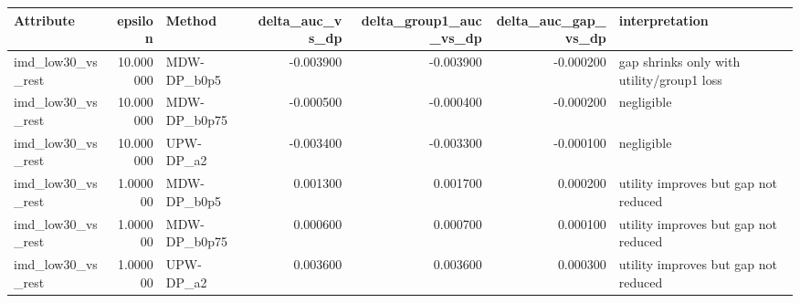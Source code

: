 \begin{tabular}{lrlrrrl}
\toprule
Attribute & epsilon & Method & delta_auc_vs_dp & delta_group1_auc_vs_dp & delta_auc_gap_vs_dp & interpretation \\
\midrule
imd_low30_vs_rest & 10.000000 & MDW-DP_b0p5 & -0.003900 & -0.003900 & -0.000200 & gap shrinks only with utility/group1 loss \\
imd_low30_vs_rest & 10.000000 & MDW-DP_b0p75 & -0.000500 & -0.000400 & -0.000200 & negligible \\
imd_low30_vs_rest & 10.000000 & UPW-DP_a2 & -0.003400 & -0.003300 & -0.000100 & negligible \\
imd_low30_vs_rest & 1.000000 & MDW-DP_b0p5 & 0.001300 & 0.001700 & 0.000200 & utility improves but gap not reduced \\
imd_low30_vs_rest & 1.000000 & MDW-DP_b0p75 & 0.000600 & 0.000700 & 0.000100 & utility improves but gap not reduced \\
imd_low30_vs_rest & 1.000000 & UPW-DP_a2 & 0.003600 & 0.003600 & 0.000300 & utility improves but gap not reduced \\
\bottomrule
\end{tabular}
